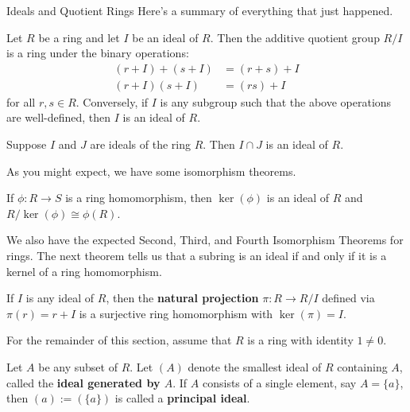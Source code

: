 \begin{section}{Ideals and Quotient Rings}
Here's a summary of everything that just happened.

\begin{theorem}
Let $R$ be a ring and let $I$ be an ideal of $R$.  Then the additive quotient group $R/I$ is a ring under the binary operations:
\begin{align}
(r+I)+(s+I) & =  (r+s)+I\\
(r+I)(s+I) & = (rs)+I
\end{align}
for all $r,s\in R$.  Conversely, if $I$ is any subgroup such that the above operations are well-defined, then $I$ is an ideal of $R$.
\end{theorem}

\begin{theorem}
Suppose $I$ and $J$ are ideals of the ring $R$.  Then $I\cap J$ is an ideal of $R$.
\end{theorem}

As you might expect, we have some isomorphism theorems.

\begin{theorem}
If $\phi:R\to S$ is a ring homomorphism, then $\ker(\phi)$ is an ideal of $R$ and $R/\ker(\phi)\cong \phi(R)$.
\end{theorem}


We also have the expected Second, Third, and Fourth Isomorphism Theorems for rings.  The next theorem tells us that a subring is an ideal if and only if it is a kernel of a ring homomorphism.

\begin{theorem}
If $I$ is any ideal of $R$, then the \textbf{natural projection} $\pi:R\to R/I$ defined via $\pi(r)=r+I$ is a surjective ring homomorphism with $\ker(\pi)=I$.
\end{theorem}

For the remainder of this section, assume that $R$ is a ring with identity $1\neq 0$.

\begin{definition}
Let $A$ be any subset of $R$. Let $(A)$ denote the smallest ideal of $R$ containing $A$, called the \textbf{ideal generated by $A$}. If $A$ consists of a single element, say $A=\{a\}$, then $(a):=(\{a\})$ is called a \textbf{principal ideal}.
\end{definition}


\end{section}
